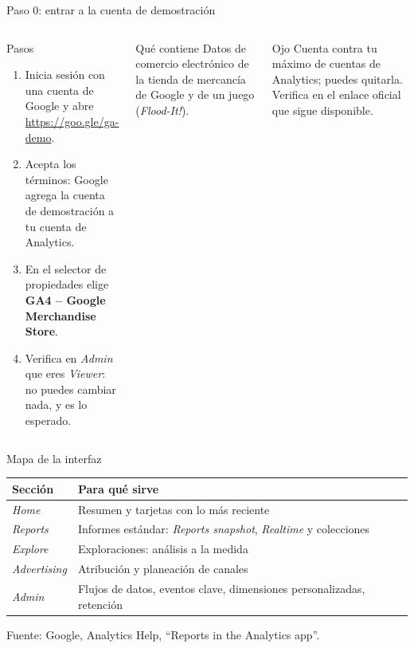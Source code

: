 \documentclass[aspectratio=169,xcolor=dvipsnames]{beamer}
\newcommand{\fuente}[1]{{\tiny\color{IPNgris}Fuente: #1}}
\begin{document}
\begin{frame}{Paso 0: entrar a la cuenta de demostración}
\begin{columns}[T]
  \begin{block}{Pasos}
    \small
    \begin{enumerate}
      \item Inicia sesión con una cuenta de Google y abre \url{https://goo.gle/ga-demo}.
      \item Acepta los términos: Google agrega la cuenta de demostración a tu cuenta de Analytics.
      \item En el selector de propiedades elige \textbf{GA4 -- Google Merchandise Store}.
      \item Verifica en \textit{Admin} que eres \textit{Viewer}: no puedes cambiar nada, y es lo esperado.
    \end{enumerate}
  \end{block}
  \begin{exampleblock}{Qué contiene}
    \scriptsize Datos de comercio electrónico de la tienda de mercancía de Google y de un juego (\textit{Flood-It!}).
  \end{exampleblock}
  \begin{alertblock}{Ojo}
    \scriptsize Cuenta contra tu máximo de cuentas de Analytics; puedes quitarla. Verifica en el enlace oficial que sigue disponible.
  \end{alertblock}
\end{columns}
\end{frame}

\begin{frame}{Mapa de la interfaz}
\small
\begin{center}
\begin{tabular}{@{}>{\raggedright}p{2.3cm}>{\raggedright\arraybackslash}p{9.4cm}@{}}
\toprule
\textbf{Sección} & \textbf{Para qué sirve} \\
\midrule
\textit{Home} & Resumen y tarjetas con lo más reciente \\
\textit{Reports} & Informes estándar: \textit{Reports snapshot}, \textit{Realtime} y colecciones \\
\textit{Explore} & Exploraciones: análisis a la medida \\
\textit{Advertising} & Atribución y planeación de canales \\
\textit{Admin} & Flujos de datos, eventos clave, dimensiones personalizadas, retención \\
\bottomrule
\end{tabular}
\end{center}
\fuente{Google, Analytics Help, \enquote{Reports in the Analytics app}.}
\end{frame}
\end{document}
